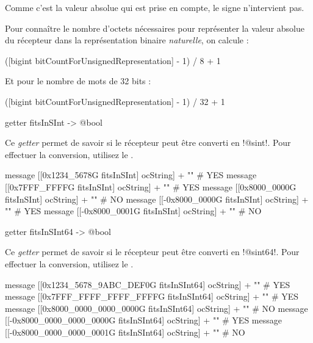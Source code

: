 Comme c'est la valeur absolue qui est prise en compte, le signe n'intervient pas.

Pour connaître le nombre d'octets nécessaires pour représenter la valeur absolue du récepteur dans la représentation binaire \emph{naturelle}, on calcule :
\begin{galgas3}
([bigint bitCountForUnsignedRepresentation] - 1) / 8 + 1
\end{galgas3}

Et pour le nombre de mots de 32 bits :
\begin{galgas3}
([bigint bitCountForUnsignedRepresentation] - 1) / 32 + 1
\end{galgas3}


\begin{galgas3box}
getter fitsInSInt -> @bool
\end{galgas3box}

Ce \emph{getter} permet de savoir si le récepteur peut être converti en \ggst!@sint!. Pour effectuer la conversion, utilisez le .

\begin{galgas3}
message [[0x1234_5678G fitsInSInt] ocString] + "\n" # YES
message [[0x7FFF_FFFFG fitsInSInt] ocString] + "\n" # YES
message [[0x8000_0000G fitsInSInt] ocString] + "\n" # NO
message [[-0x8000_0000G fitsInSInt] ocString] + "\n" # YES
message [[-0x8000_0001G fitsInSInt] ocString] + "\n" # NO
\end{galgas3}





\begin{galgas3box}
getter fitsInSInt64 -> @bool
\end{galgas3box}

Ce \emph{getter} permet de savoir si le récepteur peut être converti en \ggst!@sint64!. Pour effectuer la conversion, utilisez le .

\begin{galgas3}
message [[0x1234_5678_9ABC_DEF0G fitsInSInt64] ocString] + "\n" # YES
message [[0x7FFF_FFFF_FFFF_FFFFG fitsInSInt64] ocString] + "\n" # YES
message [[0x8000_0000_0000_0000G fitsInSInt64] ocString] + "\n" # NO
message [[-0x8000_0000_0000_0000G fitsInSInt64] ocString] + "\n" # YES
message [[-0x8000_0000_0000_0001G fitsInSInt64] ocString] + "\n" # NO
\end{galgas3}




